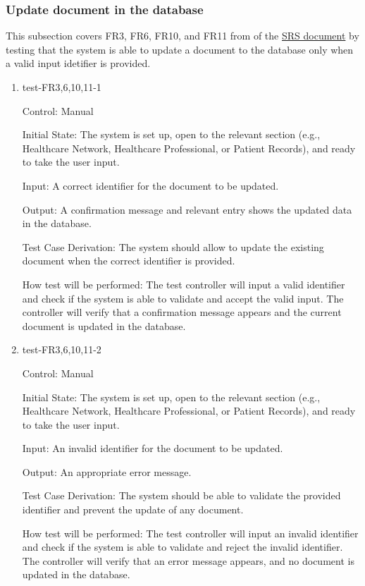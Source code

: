 \documentclass[12pt, titlepage]{article}
\begin{document}
\subsubsection{Update document in the database} \label{section:4.1.3}

This subsection covers FR3, FR6, FR10, and FR11 from of the \href{https://github.com/Inreet-Kaur/capstone/blob/main/docs/SRS/SRS.pdf}{SRS document} by testing that the system is able to update a document to the database only when a valid input idetifier is provided.

\begin{enumerate}

\item{test-FR3,6,10,11-1} \label{test-FR3,6,10,11-1}

Control: Manual

Initial State: The system is set up, open to the relevant section (e.g., Healthcare Network, Healthcare Professional, or Patient Records), and ready to take the user input.

Input: A correct identifier for the document to be updated.

Output: A confirmation message and relevant entry shows the updated data in the database.

Test Case Derivation: The system should allow to update the existing document when the correct identifier is provided.

How test will be performed: The test controller will input a valid identifier and check if the system is able to validate and accept the valid input. The controller will verify that a confirmation message appears and the current document is updated in the database.


\item{test-FR3,6,10,11-2} \label{test-FR3,6,10,11-2}

Control: Manual

Initial State: The system is set up, open to the relevant section (e.g., Healthcare Network, Healthcare Professional, or Patient Records), and ready to take the user input. 

Input: An invalid identifier for the document to be updated.

Output: An appropriate error message.

Test Case Derivation: The system should be able to validate the provided identifier and prevent the update of any document.

How test will be performed: The test controller will input an invalid identifier and check if the system is able to validate and reject the invalid identifier. The controller will verify that an error message appears, and no document is updated in the database. 

\end{enumerate}
\end{document}
